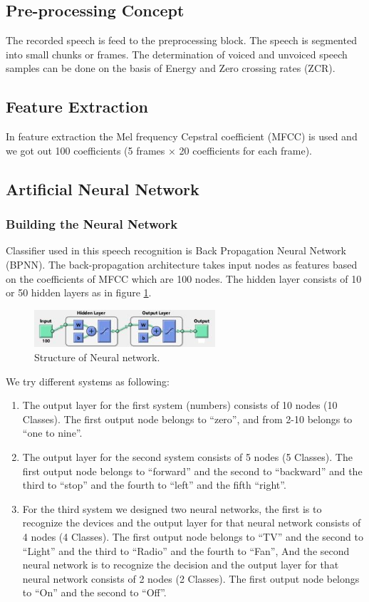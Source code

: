 \documentclass[12pt, a4paper, twoside]{report}
\begin{document}
\subsection{Pre-processing Concept}
The recorded speech is feed to the preprocessing block. The speech is segmented into small chunks or frames. The determination of voiced and unvoiced speech samples can be done on the basis of Energy and Zero crossing rates (ZCR). 
\subsection{Feature Extraction}
In feature extraction the Mel frequency Cepstral coefficient (MFCC) is used and we got out 100 coefficients (5 frames × 20 coefficients for each frame).
\subsection{Artificial Neural Network}
\subsubsection{Building the Neural Network}
Classifier used in this speech recognition is Back Propagation Neural Network (BPNN). The back-propagation architecture takes input nodes as features based on the coefficients of MFCC which are 100 nodes. The hidden layer consists of 10 or 50 hidden layers as in figure \ref{fig:nn-structure}.
\begin{figure}[!h]
	\centering
	\includegraphics[width=0.6\textwidth]
	{images/chapter5/nn-structure}
	\caption{Structure of Neural network.}
	\label{fig:nn-structure}
\end{figure}

We try different systems as following:
\begin{enumerate}
\item The output layer for the first system (numbers) consists of 10 nodes (10 Classes). The first output node belongs to “zero”, and from 2-10 belongs to “one to nine”.
\item The output layer for the second system consists of 5 nodes (5 Classes). The first output node belongs to “forward” and the second to “backward” and the third to “stop” and the fourth to “left” and the fifth “right”.
\item For the third system we designed two neural networks, the first is to recognize the devices and the output layer for that neural network consists of 4 nodes (4 Classes).
The first output node belongs to ``TV'' and the second to ``Light'' and the third to ``Radio'' and the fourth to ``Fan'', And the second neural network is to recognize the decision and the output layer for that neural network consists of 2 nodes (2 Classes). The first output node belongs to ``On'' and the second to ``Off''.
\end{enumerate}
\end{document}
